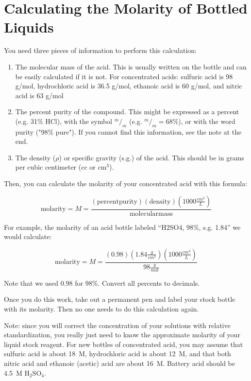\chapter{Calculating the Molarity of Bottled Liquids}

You need three pieces of information to perform this calculation:

\begin{enumerate}

\item{The molecular mass of the acid. This is usually written on the bottle and can be easily calculated if it is not. For concentrated acids: sulfuric acid is 98 g/mol, hydrochloric acid is 36.5 g/mol, ethanoic acid is 60 g/mol, and nitric acid is 63 g/mol}

\item{The percent purity of the compound. This might be expressed as a percent (e.g. 31\% HCl), with the symbol $ ^m/_m $ (e.g. $ ^m/_m = 68\% $), or with the word purity ("98\% pure"). If you cannot find this information, see the note at the end.}

\item{The density ($\rho$) or specific gravity (s.g.) of the acid. This should be in grams per cubic centimeter (cc or $\mathrm{cm}^3$).}

\end{enumerate}

Then, you can calculate the molarity of your concentrated acid with this formula:

\[ \mathrm{molarity} = M = \frac{(\mathrm{percent purity})(\mathrm{density})(1000 \frac{cm^3}{L})}{\mathrm{molecular mass}} \]

For example, the molarity of an acid bottle labeled “H2SO4, 98\%, s.g. 1.84” we would calculate:

\[ \mathrm{molarity} = M = \frac{(0.98)(1.84 \frac{g}{cm^3})(1000 \frac{cm^3}{L})}{98 \frac{g}{mol} }\]

Note that we used 0.98 for 98\%. Convert all percents to decimals.

Once you do this work, take out a permanent pen and label your stock bottle with its molarity. Then no one needs to do this calculation again.

Note: since you will correct the concentration of your solutions with relative standardization, you really just need to know the approximate molarity of your liquid stock reagent. For new bottles of concentrated acid, you may assume that sulfuric acid is about 18~M, hydrochloric acid is about 12~M, and that both nitric acid and ethanoic (acetic) acid are about 16~M. Battery acid should be 4.5~M $ \mathrm{H}_2 \mathrm{SO}_4 $.
